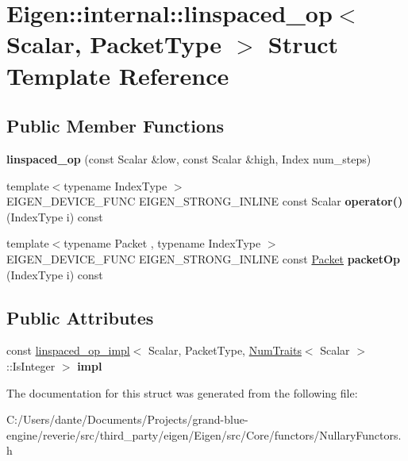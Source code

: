 \hypertarget{struct_eigen_1_1internal_1_1linspaced__op}{}\section{Eigen\+::internal\+::linspaced\+\_\+op$<$ Scalar, Packet\+Type $>$ Struct Template Reference}
\label{struct_eigen_1_1internal_1_1linspaced__op}
\subsection*{Public Member Functions}
\begin{DoxyCompactItemize}
\item 
\mbox{\label{struct_eigen_1_1internal_1_1linspaced__op_a74e377ffab00441a688b1190dc930a65}} 
{\bfseries linspaced\+\_\+op} (const Scalar \&low, const Scalar \&high, Index num\+\_\+steps)
\item 
\mbox{\label{struct_eigen_1_1internal_1_1linspaced__op_ab86424ad4c009092eb466fa98483ff5b}} 
{\footnotesize template$<$typename Index\+Type $>$ }\\E\+I\+G\+E\+N\+\_\+\+D\+E\+V\+I\+C\+E\+\_\+\+F\+U\+NC E\+I\+G\+E\+N\+\_\+\+S\+T\+R\+O\+N\+G\+\_\+\+I\+N\+L\+I\+NE const Scalar {\bfseries operator()} (Index\+Type i) const
\item 
\mbox{\label{struct_eigen_1_1internal_1_1linspaced__op_a217a0431792ac4ff26701b596bca99ce}} 
{\footnotesize template$<$typename Packet , typename Index\+Type $>$ }\\E\+I\+G\+E\+N\+\_\+\+D\+E\+V\+I\+C\+E\+\_\+\+F\+U\+NC E\+I\+G\+E\+N\+\_\+\+S\+T\+R\+O\+N\+G\+\_\+\+I\+N\+L\+I\+NE const \mbox{\hyperlink{union_eigen_1_1internal_1_1_packet}{Packet}} {\bfseries packet\+Op} (Index\+Type i) const
\end{DoxyCompactItemize}
\subsection*{Public Attributes}
\begin{DoxyCompactItemize}
\item 
\mbox{\label{struct_eigen_1_1internal_1_1linspaced__op_a76504e7cefb1b1149326a325ee99b5c9}} 
const \mbox{\hyperlink{struct_eigen_1_1internal_1_1linspaced__op__impl}{linspaced\+\_\+op\+\_\+impl}}$<$ Scalar, Packet\+Type, \mbox{\hyperlink{struct_eigen_1_1_num_traits}{Num\+Traits}}$<$ Scalar $>$\+::Is\+Integer $>$ {\bfseries impl}
\end{DoxyCompactItemize}


The documentation for this struct was generated from the following file\+:\begin{DoxyCompactItemize}
\item 
C\+:/\+Users/dante/\+Documents/\+Projects/grand-\/blue-\/engine/reverie/src/third\+\_\+party/eigen/\+Eigen/src/\+Core/functors/Nullary\+Functors.\+h\end{DoxyCompactItemize}
